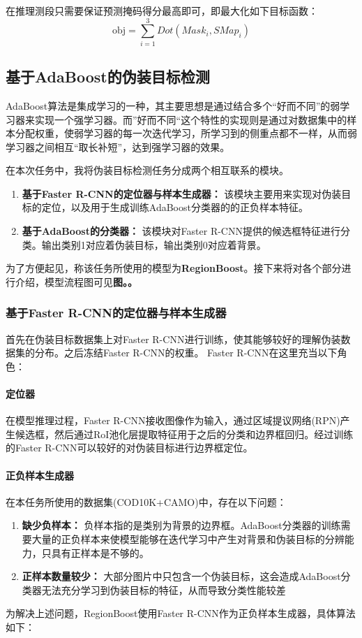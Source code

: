 \documentclass[a4paper,12pt]{ctexart}
\begin{document}
在推理测段只需要保证预测掩码得分最高即可，即最大化如下目标函数：
$$
\text{obj} = \sum_{i=1}^3 Dot(Mask_{i},SMap_{i})
$$


\subsection{基于AdaBoost的伪装目标检测}

AdaBoost算法是集成学习的一种，其主要思想是通过结合多个“好而不同”的弱学习器来实现一个强学习器。而”好而不同“这个特性的实现则是通过对数据集中的样本分配权重，使弱学习器的每一次迭代学习，所学习到的侧重点都不一样，从而弱学习器之间相互“取长补短”，达到强学习器的效果。

在本次任务中，我将伪装目标检测任务分成两个相互联系的模块。
\begin{enumerate}
    \item \textbf{基于Faster R-CNN的定位器与样本生成器：} 该模块主要用来实现对伪装目标的定位，以及用于生成训练AdaBoost分类器的的正负样本特征。
    \item \textbf{基于AdaBoost的分类器：} 该模块对Faster R-CNN提供的候选框特征进行分类。输出类别1对应着伪装目标，输出类别0对应着背景。
\end{enumerate}
为了方便起见，称该任务所使用的模型为\textbf{RegionBoost}。接下来将对各个部分进行介绍，模型流程图可见\textbf{图。。}

\subsubsection{基于Faster R-CNN的定位器与样本生成器}
首先在伪装目标数据集上对Faster R-CNN进行训练，使其能够较好的理解伪装数据集的分布。之后冻结Faster R-CNN的权重。
Faster R-CNN在这里充当以下角色：
\paragraph{定位器}
在模型推理过程，Faster R-CNN接收图像作为输入，通过区域提议网络(RPN)产生候选框，然后通过RoI池化层提取特征用于之后的分类和边界框回归。经过训练的Faster R-CNN可以较好的对伪装目标进行边界框定位。

\paragraph{正负样本生成器}
在本任务所使用的数据集(COD10K+CAMO)中，存在以下问题：
\begin{enumerate}
    \item \textbf{缺少负样本：} 负样本指的是类别为背景的边界框。AdaBoost分类器的训练需要大量的正负样本来使模型能够在迭代学习中产生对背景和伪装目标的分辨能力，只具有正样本是不够的。
    \item \textbf{正样本数量较少：} 大部分图片中只包含一个伪装目标，这会造成AdaBoost分类器无法充分学习到伪装目标的特征，从而导致分类性能较差
\end{enumerate}
为解决上述问题，RegionBoost使用Faster R-CNN作为正负样本生成器，具体算法如下：
\end{document}
